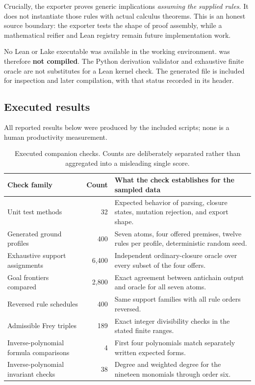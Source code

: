 \documentclass[11pt,a4paper]{article}
\newcommand{\code}[1]{\texttt{\small\detokenize{#1}}}
\theoremstyle{definition}\newtheorem{definition}[theorem]{Definition}
\theoremstyle{remark}\newtheorem{remark}[theorem]{Remark}
\begin{document}
Crucially, the exporter proves generic implications \emph{assuming the supplied rules}. It does not instantiate those rules with actual calculus theorems. This is an honest source boundary: the exporter tests the shape of proof assembly, while a mathematical reifier and Lean registry remain future implementation work.

No Lean or Lake executable was available in the working environment. \code{Generated.lean} was therefore \textbf{not compiled}. The Python derivation validator and exhaustive finite oracle are not substitutes for a Lean kernel check. The generated file is included for inspection and later compilation, with that status recorded in its header.

\subsection{Executed results}
All reported results below were produced by the included scripts; none is a human productivity measurement.
\begin{table}[htbp]\small
\caption{Executed companion checks. Counts are deliberately separated rather than aggregated into a misleading single score.}
\begin{tabularx}{\textwidth}{@{}L{44mm}rY@{}}\toprule
Check family & Count & What the check establishes for the sampled data\\\midrule
Unit test methods & 32 & Expected behavior of parsing, closure states, mutation rejection, and export shape.\\
Generated ground profiles & 400 & Seven atoms, four offered premises, twelve rules per profile, deterministic random seed.\\
Exhaustive support assignments & 6,400 & Independent ordinary-closure oracle over every subset of the four offers.\\
Goal frontiers compared & 2,800 & Exact agreement between antichain output and oracle for all seven atoms.\\
Reversed rule schedules & 400 & Same support families with all rule orders reversed.\\
Admissible Frey triples & 189 & Exact integer divisibility checks in the stated finite ranges.\\
Inverse-polynomial formula comparisons & 4 & First four polynomials match separately written expected forms.\\
Inverse-polynomial invariant checks & 38 & Degree and weighted degree for the nineteen monomials through order six.\\\bottomrule
\end{tabularx}
\end{table}
\end{document}
